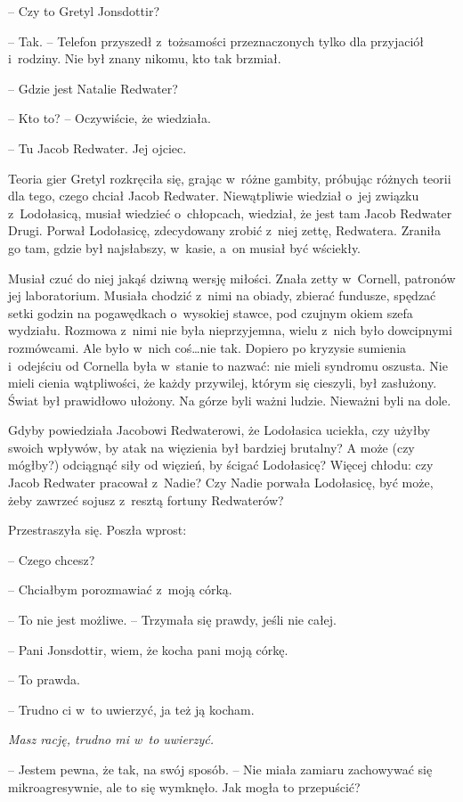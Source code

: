 \documentclass[oneside,polish,11pt,sfheadings]{mwbk}
\begin{document}
-- Czy to Gretyl Jonsdottir?

-- Tak. -- Telefon przyszedł z~tożsamości przeznaczonych tylko dla
przyjaciół i~rodziny. Nie był znany nikomu, kto tak brzmiał.

-- Gdzie jest Natalie Redwater?

-- Kto to? -- Oczywiście, że wiedziała.

-- Tu Jacob Redwater. Jej ojciec.

Teoria gier Gretyl rozkręciła się, grając w~różne gambity, próbując
różnych teorii dla tego, czego chciał Jacob Redwater. Niewątpliwie
wiedział o~jej związku z~Lodołasicą, musiał wiedzieć o~chłopcach,
wiedział, że jest tam Jacob Redwater Drugi. Porwał Lodołasicę,
zdecydowany zrobić z~niej zettę, Redwatera. Zraniła go tam, gdzie był
najsłabszy, w~kasie, a~on musiał być wściekły.

Musiał czuć do niej jakąś dziwną wersję miłości. Znała zetty w~Cornell,
patronów jej laboratorium. Musiała chodzić z~nimi na obiady, zbierać
fundusze, spędzać setki godzin na pogawędkach o~wysokiej stawce, pod
czujnym okiem szefa wydziału. Rozmowa z~nimi nie była nieprzyjemna,
wielu z~nich było dowcipnymi rozmówcami. Ale było w~nich coś\ldots  nie tak.
Dopiero po kryzysie sumienia i~odejściu od Cornella była w~stanie to
nazwać: nie mieli syndromu oszusta. Nie mieli cienia wątpliwości, że
każdy przywilej, którym się cieszyli, był zasłużony. Świat był
prawidłowo ułożony. Na górze byli ważni ludzie. Nieważni byli na dole.

Gdyby powiedziała Jacobowi Redwaterowi, że Lodołasica uciekła, czy
użyłby swoich wpływów, by atak na więzienia był bardziej brutalny? A
może (czy mógłby?) odciągnąć siły od więzień, by ścigać Lodołasicę?
Więcej chłodu: czy Jacob Redwater pracował z~Nadie? Czy Nadie porwała
Lodołasicę, być może, żeby zawrzeć sojusz z~resztą fortuny Redwaterów?

Przestraszyła się. Poszła wprost: 

-- Czego chcesz?

-- Chciałbym porozmawiać z~moją córką.

-- To nie jest możliwe. -- Trzymała się prawdy, jeśli nie całej.

-- Pani Jonsdottir, wiem, że kocha pani moją córkę.

-- To prawda.

-- Trudno ci w~to uwierzyć, ja też ją kocham.

\textit{Masz rację, trudno mi w~to uwierzyć.} 

-- Jestem pewna, że tak, na swój sposób. -- Nie miała zamiaru zachowywać się mikroagresywnie, ale to
się wymknęło. Jak mogła to przepuścić?
\end{document}
